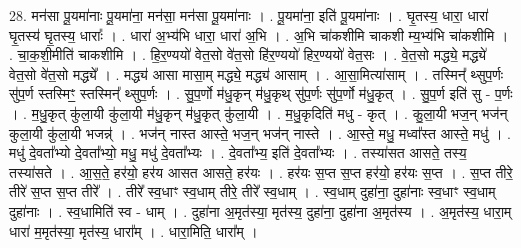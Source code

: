 \documentclass[17pt]{extarticle}
\begin{document}
28. मन॑सा पू॒यमा॑नाः पू॒यमा॑ना॒ मन॑सा॒ मन॑सा पू॒यमा॑नाः । . पू॒यमा॑ना॒ इति॑ पू॒यमा॑नाः । . घृ॒तस्य॒ धारा॒ धारा॑ घृ॒तस्य॑ घृ॒तस्य॒ धाराः᳚ । . धारा॑ अ॒भ्य॑भि धारा॒ धारा॑ अ॒भि । . अ॒भि चा॑कशीमि चाकशी म्य॒भ्य॑भि चा॑कशीमि । . चा॒क॒शी॒मीति॑ चाकशीमि । . हि॒र॒ण्ययो॑ वेत॒सो वे॑त॒सो हि॑र॒ण्ययो॑ हिर॒ण्ययो॑ वेत॒सः । . वे॒त॒सो मद्ध्ये॒ मद्ध्ये॑ वेत॒सो वे॑त॒सो मद्ध्ये᳚ । . मद्ध्य॑ आसा मासा॒म् मद्ध्ये॒ मद्ध्य॑ आसाम् । . आ॒सा॒मित्या॑साम् । . तस्मिन्᳚ थ्सुप॒र्णः सु॑प॒र्ण स्तस्मिꣳ॒॒ स्तस्मिन्᳚ थ्सुप॒र्णः । . सु॒प॒र्णो म॑धु॒कृन् म॑धु॒कृथ् सु॑प॒र्णः सु॑प॒र्णो म॑धु॒कृत् । . सु॒प॒र्ण इति॑ सु - प॒र्णः । . म॒धु॒कृत् कु॑ला॒यी कु॑ला॒यी म॑धु॒कृन् म॑धु॒कृत् कु॑ला॒यी । . म॒धु॒कृदिति॑ मधु - कृत् । . कु॒ला॒यी भज॒न् भज॑न् कुला॒यी कु॑ला॒यी भजन्न्॑ । . भज॑न् नास्त आस्ते॒ भज॒न् भज॑न् नास्ते । . आ॒स्ते॒ मधु॒ मध्वा᳚स्त आस्ते॒ मधु॑ । . मधु॑ दे॒वता᳚भ्यो दे॒वता᳚भ्यो॒ मधु॒ मधु॑ दे॒वता᳚भ्यः । . दे॒वता᳚भ्य॒ इति॑ दे॒वता᳚भ्यः । . तस्या॑सत आसते॒ तस्य॒ तस्या॑सते । . आ॒स॒ते॒ हर॑यो॒ हर॑य आसत आसते॒ हर॑यः । . हर॑यः स॒प्त स॒प्त हर॑यो॒ हर॑यः स॒प्त । . स॒प्त तीरे॒ तीरे॑ स॒प्त स॒प्त तीरे᳚ । . तीरे᳚ स्व॒धाꣳ स्व॒धाम् तीरे॒ तीरे᳚ स्व॒धाम् । . स्व॒धाम् दुहा॑ना॒ दुहा॑नाः स्व॒धाꣳ स्व॒धाम् दुहा॑नाः । . स्व॒धामिति॑ स्व - धाम् । . दुहा॑ना अ॒मृत॑स्या॒ मृत॑स्य॒ दुहा॑ना॒ दुहा॑ना अ॒मृत॑स्य । . अ॒मृत॑स्य॒ धारा॒म् धारा॑ म॒मृत॑स्या॒ मृत॑स्य॒ धारा᳚म् । . धारा॒मिति॒ धारा᳚म् । \newline
\end{document}
